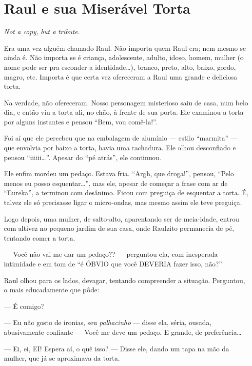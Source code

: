 \chapter{Raul e sua Miserável Torta}

\begin{flushright}
\foreignlanguage{english}{\emph{Not a copy, but a tribute.}}
\end{flushright}

Era uma vez alguém chamado Raul. Não importa quem Raul era; nem mesmo se ainda é. Não importa se é criança, adolescente, adulto, idoso, homem, mulher (o nome pode ser pra esconder a identidade\ldots), branco, preto, alto, baixo, gordo, magro, etc. Importa é que certa vez ofereceram a Raul uma grande e deliciosa torta.

Na verdade, não ofereceram. Nosso personagem misterioso saiu de casa, num belo dia, e então viu a torta ali, no chão, à frente de sua porta. Ele examinou a torta por alguns instantes e pensou ``Bem, vou comê-la!''.

Foi aí que ele percebeu que na embalagem de alumínio --- estilo ``marmita'' --- que envolvia por baixo a torta, havia uma rachadura. Ele olhou desconfiado e pensou ``iiiiii\ldots''. Apesar do ``pé atrás'', ele continuou.

Ele enfim mordeu um pedaço. Estava fria. ``Argh, que droga!'', pensou, ``Pelo menos eu posso esquentar\ldots'', mas ele, apesar de começar a frase com ar de ``Eureka'', a terminou com desânimo. Ficou com preguiça de esquentar a torta. É, talvez ele só precisasse ligar o micro-ondas, mas mesmo assim ele teve preguiça.

Logo depois, uma mulher, de salto-alto, aparentando ser de meia-idade, entrou com altivez no pequeno jardim de sua casa, onde Raulzito permanecia de pé, tentando comer a torta.

--- Você não vai me dar um pedaço?? --- perguntou ela, com inesperada intimidade e em tom de ``é ÓBVIO que você DEVERIA fazer isso, não?''

Raul olhou para os lados, devagar, tentando compreender a situação. Perguntou, o mais educadamente que pôde:

--- É comigo?

--- Eu não gosto de ironias, seu \emph{palhacinho} --- disse ela, séria, ousada, abusivamente confiante --- Você me deve um pedaço. E grande, de preferência\ldots

--- Ei, ei, EI! Espera aí, o quê isso? --- Disse ele, dando um tapa na mão da mulher, que já se aproximava da torta.


